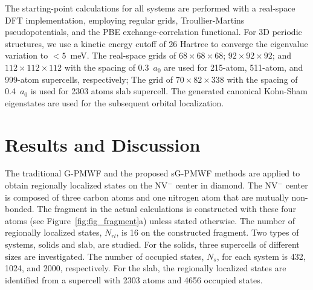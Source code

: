 \documentclass[journal=jacsat,manuscript=article]{achemso}
\begin{document}
The starting-point calculations for all systems are performed with a real-space DFT implementation, employing regular grids, Troullier-Martins pseudopotentials\cite{TroullierMartins1991}, and the PBE\cite{PerdewWang} exchange-correlation functional. For 3D periodic structures, we use a kinetic energy cutoff of 26 Hartree to converge the eigenvalue variation to $< 5$~meV. The real-space grids of $68\times 68 \times 68$; $92\times 92 \times 92$; and $ 112 \times 112 \times 112$ with the spacing of 0.3~$a_0$ are used for 215-atom, 511-atom, and 999-atom supercells, respectively; The grid of $70\times 82 \times 338$ with the spacing of 0.4~$a_0$ is used for 2303 atoms slab supercell. The generated canonical Kohn-Sham eigenstates are used for the subsequent orbital localization.

\section{\label{sec:result}Results and Discussion}
The traditional G-PMWF and the proposed sG-PMWF methods are applied to obtain regionally localized states on the NV$^-$ center in diamond. The NV$^-$ center is composed of three carbon atoms and one nitrogen atom that are mutually non-bonded. The fragment in the actual calculations is constructed with these four atoms (see Figure~\ref{fig:fig_fragment}a) unless stated otherwise. The number of regionally localized states, $N_{rl}$, is 16 on the constructed fragment. Two types of systems, solids and slab, are studied. For the solids, three supercells of different sizes are investigated. The number of occupied states, $N_s$, for each system is 432, 1024, and 2000, respectively. For the slab, the regionally localized states are identified from a supercell with 2303 atoms and 4656 occupied states.
\end{document}
